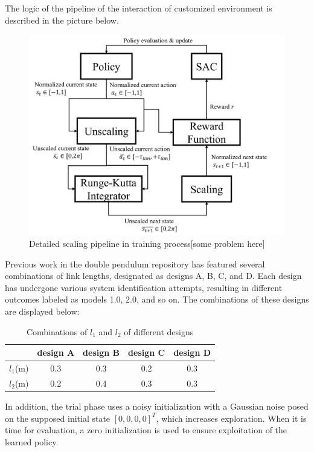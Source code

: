 The logic of the pipeline of the interaction of customized environment is described in the picture below.

\begin{figure}[H]
    \centering
    \includegraphics[width=0.85\linewidth]{figures/simulation_result/scaling_mechanism.png}
    \caption{Detailed scaling pipeline in training process[some problem here]}
    \label{fig:scasling_mech}
\end{figure}

Previous work in the double pendulum repository has featured several combinations of link lengths, designated as designs A, B, C, and D. Each design has undergone various system identification attempts, resulting in different outcomes labeled as models 1.0, 2.0, and so on. The combinations of these designs are displayed below:

\begin{table}[ht]
\centering
\begin{tabular}{|c|c|c|c|c|}
\hline
  & design A & design B & design C & design D \\
\hline
$l_1$(m) & 0.3 & 0.3 & 0.2 & 0.3 \\
\hline
$l_2$(m) & 0.2 & 0.4 & 0.3 & 0.3 \\
\hline
\end{tabular}
\caption{Combinations of $l_1$ and $l_2$ of different designs}
\label{tab:different_designs}
\end{table}

In addition, the trial phase uses a noisy initialization with a Gaussian noise posed on the supposed initial state \([0,0,0,0]^T\), which increases exploration. When it is time for evaluation, a zero initialization is used to ensure exploitation of the learned policy.


